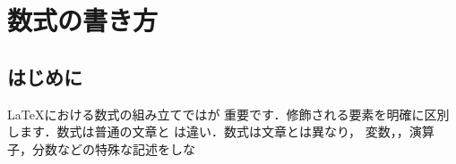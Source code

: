 \chapter{数式の書き方}
%
\begin{abstract}
{\LaTeX}は{\TeX}をベースにした組版システムなので
数式の組版が得意です．この章では基本的な数式の出力
の仕方を紹介します．数式は通常の文章とは異なった組版が
行なわれます．%
\end{abstract}

\section{はじめに}
{\LaTeX}における数式の組み立てではが
重要です．修飾される要素を明確に区別します．数式は普通の文章と
%
は違い．数式は文章とは異なり，
変数，，演算子，分数などの特殊な記述をしな
